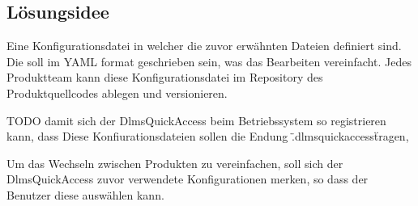 \subsection{Lösungsidee}
Eine Konfigurationsdatei in welcher die zuvor erwähnten Dateien definiert sind. Die soll im YAML format geschrieben sein, was das Bearbeiten vereinfacht.
Jedes Produktteam kann diese Konfigurationsdatei im Repository des Produktquellcodes ablegen und versionieren.

TODO
damit sich der DlmsQuickAccess beim Betriebssystem so registrieren kann, dass 
Diese Konfiurationsdateien sollen die Endung \".dlmsquickaccess\" tragen, 

Um das Wechseln zwischen Produkten zu vereinfachen, soll sich der DlmsQuickAccess zuvor verwendete Konfigurationen merken, so dass der Benutzer diese auswählen kann.

